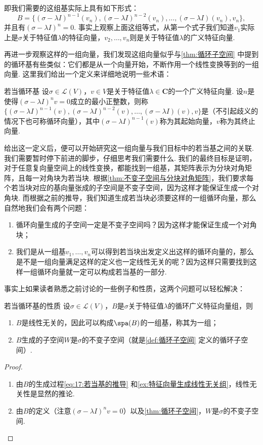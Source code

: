 即我们需要的这组基实际上具有如下形式：
\[B=\{(\sigma-\lambda I)^{n-1}(v_n),(\sigma-\lambda I)^{n-2}(v_n),\ldots,(\sigma-\lambda I)(v_n),v_n\},\]
并且有$(\sigma-\lambda I)^n=0$. 事实上观察上面这组等式，从第一个式子我们知道$v_1$实际上是$\sigma$关于特征值$\lambda$的特征向量，$v_2,\ldots,v_n$则是关于特征值$\lambda$的广义特征向量.

再进一步观察这样的一组向量，我们发现这组向量似乎与\autoref{thm:循环子空间} 中提到的循环基有些类似：它们都是从一个向量开始，不断作用一个线性变换等到的一组向量. 这里我们给出一个定义来详细地说明一些术语：
\begin{definition}{}{若当循环基}
    设$\sigma\in\mathcal{L}(V)$，$v\in V$是关于特征值$\lambda\in\mathbf{C}$的一个广义特征向量. 设$n$是使得$(\sigma-\lambda I)^n v=0$成立的最小正整数，则称$\{(\sigma-\lambda I)^{n-1}(v),(\sigma-\lambda I)^{n-2}(v),\ldots,(\sigma-\lambda I)(v),v\}$是（不引起歧义的情况下也可称循环向量），其中$(\sigma-\lambda I)^{n-1}(v)$称为其起始向量，$v$称为其终止向量.
\end{definition}

给出这一定义后，便可以开始研究这一组向量与我们目标中的若当基之间的关联. 我们需要暂时停下前进的脚步，仔细思考我们需要什么. 我们的最终目标是证明，对于任意复向量空间上的线性变换，都能找到一组基，其矩阵表示为分块对角矩阵，且每一对角块为若当块. 根据\autoref{thm:不变子空间与分块对角矩阵}，我们要求每个若当块对应的基向量张成的子空间是不变子空间，因为这样才能保证生成一个对角块. 而根据之前的推导，我们知道生成若当块必须要这样的一组循环向量，那么自然地我们会有两个问题：
\begin{enumerate}
    \item 循环向量生成的子空间一定是不变子空间吗？因为这样才能保证生成一个对角块；
    \item 我们是从一组基$v_1,\ldots,v_n$可以得到若当块出发定义出这样的循环向量的，那么是不是一组向量满足这样的定义也一定线性无关的呢？因为这样只需要找到这样一组循环向量就一定可以构成若当基的一部分.
\end{enumerate}
事实上如果读者熟悉之前讨论的一些例子和性质，这两个问题可以轻松解决：
\begin{theorem}{}{若当循环基的性质}
    设$\sigma\in\mathcal{L}(V)$，$B$是$\sigma$关于特征值$\lambda$的循环广义特征向量组，则
    \begin{enumerate}
        \item $B$是线性无关的，因此可以构成$\spa(B)$的一组基，称其为一组；
        \item $B$生成的子空间$W$是$\sigma$的不变子空间（就是\autoref{def:循环子空间} 定义的循环子空间）.
    \end{enumerate}
\end{theorem}
\begin{proof}
    \begin{enumerate}
        \item 由$B$的生成过程\autoref{eq:17:若当基的推导} 和\autoref{ex:特征向量生成线性无关组}，线性无关性是显然的推论.
        \item 由$B$的定义（注意$(\sigma-\lambda I)^n v=0$）以及\autoref{thm:循环子空间}，$W$是$\sigma$的不变子空间.
    \end{enumerate}
\end{proof}


